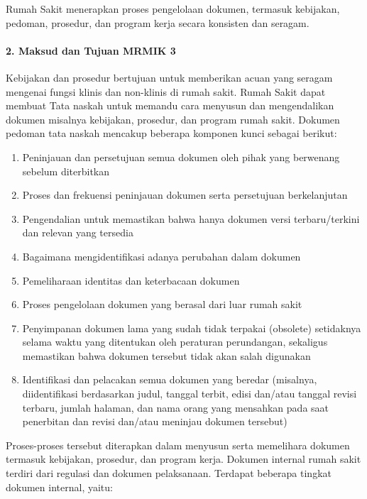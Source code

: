 \documentclass[
]{book}
\providecommand{\tightlist}{%
  \setlength{\itemsep}{0pt}\setlength{\parskip}{0pt}}
\begin{document}
Rumah Sakit menerapkan proses pengelolaan dokumen, termasuk kebijakan, pedoman, prosedur, dan program kerja secara konsisten dan seragam.

\hypertarget{maksud-dan-tujuan-mrmik-3}{%
\paragraph*{2. Maksud dan Tujuan MRMIK 3}\label{maksud-dan-tujuan-mrmik-3}}

Kebijakan dan prosedur bertujuan untuk memberikan acuan yang seragam mengenai fungsi klinis dan non-klinis di rumah sakit. Rumah Sakit dapat membuat Tata naskah untuk memandu cara menyusun dan mengendalikan dokumen misalnya kebijakan, prosedur, dan program rumah sakit. Dokumen pedoman tata naskah mencakup beberapa komponen kunci sebagai berikut:

\begin{enumerate}
\def\labelenumi{\alph{enumi}.}
\tightlist
\item
  Peninjauan dan persetujuan semua dokumen oleh pihak yang berwenang sebelum diterbitkan
\item
  Proses dan frekuensi peninjauan dokumen serta persetujuan berkelanjutan
\item
  Pengendalian untuk memastikan bahwa hanya dokumen versi terbaru/terkini dan relevan yang tersedia
\item
  Bagaimana mengidentifikasi adanya perubahan dalam dokumen
\item
  Pemeliharaan identitas dan keterbacaan dokumen
\item
  Proses pengelolaan dokumen yang berasal dari luar rumah sakit
\item
  Penyimpanan dokumen lama yang sudah tidak terpakai (obsolete) setidaknya selama waktu yang ditentukan oleh peraturan perundangan, sekaligus memastikan bahwa dokumen tersebut tidak akan salah digunakan
\item
  Identifikasi dan pelacakan semua dokumen yang beredar (misalnya, diidentifikasi berdasarkan judul, tanggal terbit, edisi dan/atau tanggal revisi terbaru, jumlah halaman, dan nama orang yang mensahkan pada saat penerbitan dan revisi dan/atau meninjau dokumen tersebut)
\end{enumerate}

Proses-proses tersebut diterapkan dalam menyusun serta memelihara dokumen termasuk kebijakan, prosedur, dan program kerja.
Dokumen internal rumah sakit terdiri dari regulasi dan dokumen pelaksanaan. Terdapat beberapa tingkat dokumen internal, yaitu:
\end{document}
